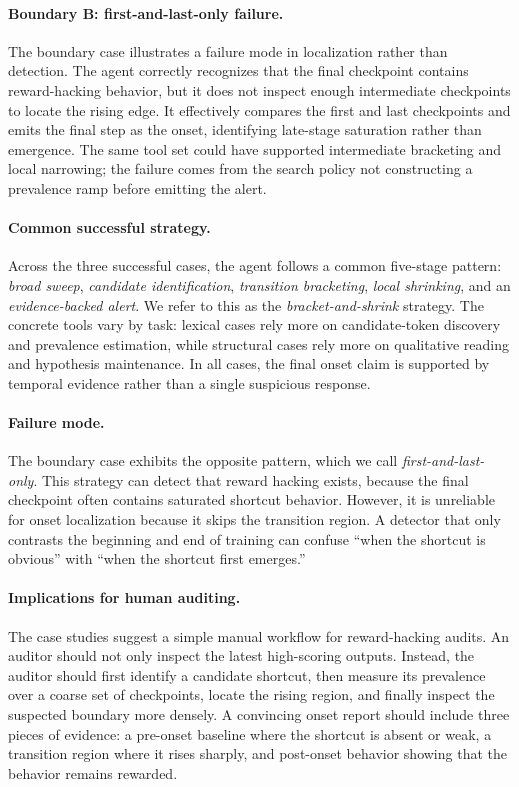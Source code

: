 \documentclass[11pt]{article}
\begin{document}
\paragraph{Boundary B: first-and-last-only failure.}
The boundary case illustrates a failure mode in localization rather than detection. The agent correctly recognizes that the final checkpoint contains reward-hacking behavior, but it does not inspect enough intermediate checkpoints to locate the rising edge. It effectively compares the first and last checkpoints and emits the final step as the onset, identifying late-stage saturation rather than emergence. The same tool set could have supported intermediate bracketing and local narrowing; the failure comes from the search policy not constructing a prevalence ramp before emitting the alert.

\paragraph{Common successful strategy.}

Across the three successful cases, the agent follows a common five-stage pattern: \emph{broad sweep}, \emph{candidate identification}, \emph{transition bracketing}, \emph{local shrinking}, and an \emph{evidence-backed alert}. We refer to this as the \emph{bracket-and-shrink} strategy. The concrete tools vary by task: lexical cases rely more on candidate-token discovery and prevalence estimation, while structural cases rely more on qualitative reading and hypothesis maintenance. In all cases, the final onset claim is supported by temporal evidence rather than a single suspicious response.

\paragraph{Failure mode.}
The boundary case exhibits the opposite pattern, which we call \emph{first-and-last-only}. This strategy can detect that reward hacking exists, because the final checkpoint often contains saturated shortcut behavior. However, it is unreliable for onset localization because it skips the transition region. A detector that only contrasts the beginning and end of training can confuse ``when the shortcut is obvious'' with ``when the shortcut first emerges.''


\paragraph{Implications for human auditing.}
The case studies suggest a simple manual workflow for reward-hacking audits. An auditor should not only inspect the latest high-scoring outputs. Instead, the auditor should first identify a candidate shortcut, then measure its prevalence over a coarse set of checkpoints, locate the rising region, and finally inspect the suspected boundary more densely. A convincing onset report should include three pieces of evidence: a pre-onset baseline where the shortcut is absent or weak, a transition region where it rises sharply, and post-onset behavior showing that the behavior remains rewarded.
\end{document}
